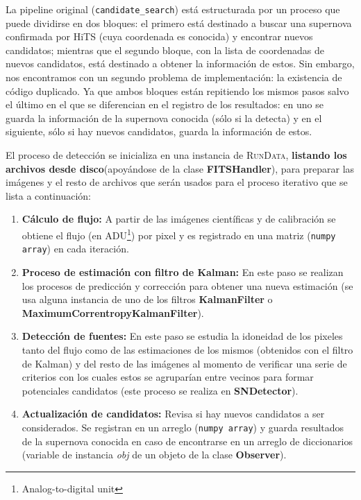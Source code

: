 La pipeline original (\texttt{candidate\_search}) est\'a estructurada por un proceso que puede dividirse en dos bloques: el primero est\'a destinado a buscar una supernova confirmada por HiTS (cuya coordenada es conocida) y encontrar nuevos candidatos; mientras que el segundo bloque, con la lista de coordenadas de nuevos candidatos, est\'a destinado a obtener la informaci\'on de estos. Sin embargo, nos encontramos con un segundo problema de implementaci\'on: la existencia de c\'odigo duplicado. Ya que ambos bloques est\'an repitiendo los mismos pasos salvo el \'ultimo en el que se diferencian en el registro de los resultados: en uno se guarda la informaci\'on de la supernova conocida (s\'olo si la detecta) y en el siguiente, s\'olo si hay nuevos candidatos, guarda la informaci\'on de estos.%
\bigskip

El proceso de detecci\'on se inicializa en una instancia de \textsc{RunData}, \textbf{listando los archivos desde disco}(apoy\'andose de la clase \textbf{FITSHandler}), para preparar las im\'agenes y el resto de archivos que ser\'an usados para el proceso iterativo que se lista a continuaci\'on: 

\begin{enumerate}
\item \textbf{C\'alculo de flujo:} A partir de las im\'agenes cient\'ificas y de calibraci\'on se obtiene el flujo (en ADU\footnote{Analog-to-digital unit}) por pixel y es registrado en una matriz (\texttt{numpy array}) en cada iteraci\'on. 
\item \textbf{Proceso de estimaci\'on con filtro de Kalman:} En este paso se realizan los procesos de predicci\'on y correcci\'on para obtener una nueva estimaci\'on (se usa alguna instancia de uno de los filtros \textbf{KalmanFilter} o \textbf{MaximumCorrentropyKalmanFilter}). 
\item \textbf{Detecci\'on de fuentes:} En este paso se estudia la idoneidad de los pixeles tanto del flujo como de las estimaciones de los mismos (obtenidos con el filtro de Kalman) y del resto de las im\'agenes al momento de verificar una serie de criterios con los cuales estos se agrupar\'ian entre vecinos para formar potenciales candidatos (este proceso se realiza en \textbf{SNDetector}).  
\item \textbf{Actualizaci\'on de candidatos:} Revisa si hay nuevos candidatos a ser considerados. Se registran en un arreglo (\texttt{numpy array}) y guarda resultados de la supernova conocida en caso de encontrarse en un arreglo de diccionarios (variable de instancia \textit{obj} de un objeto de la clase \textbf{Observer}).
\end{enumerate}

